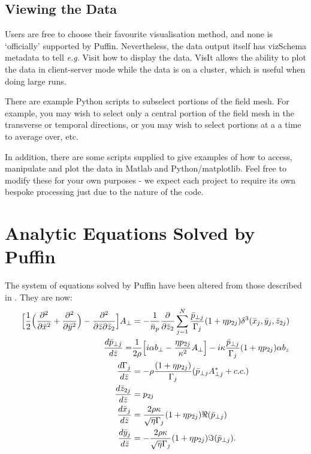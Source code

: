 \documentclass[12pt]{article}%
\begin{document}
\subsection{Viewing the Data}

Users are free to choose their favourite visualisation method, and none is `officially' supported by Puffin. Nevertheless, the data output itself has vizSchema metadata to tell \textit{e.g.} Visit how to display the data. VisIt allows the ability to plot the data in client-server mode while the data is on a cluster, which is useful when doing large runs. 

There are example Python scripts to subselect portions of the field mesh. For example, you may wish to select only a central portion of the field mesh in the transverse or temporal directions, or you may wish to select portions at a a time to average over, etc.

In addition, there are some scripts supplied to give examples of how to access, manipulate and plot the data in Matlab and Python/matplotlib. Feel free to modify these for your own purposes - we expect each project to require its own bespoke processing just due to the nature of the code.


\newpage

\section{Analytic Equations Solved by Puffin}

\label{puff-eqns}

The system of equations solved by Puffin have been altered from those described in \cite{puffin}. They are now:
\begin{align}
\Bigl[\frac{1}{2}\Bigl(\frac{\partial^2}{\partial\bar{x}^2} + \frac{\partial^2}{\partial\bar{y}^2}\Bigr) -  \frac{\partial^2}{\partial\bar{z}\partial\bar{z}_2}\Bigr]A_{\bot}  & = -\frac{1}{\bar{n}_p}\frac{\partial}{\partial \bar{z}_2}\sum_{j=1}^{N} \frac{\bar{p}_{\bot j}}{\Gamma_j} (1+\eta p_{2j})     \delta^3(\bar{x}_j,\bar{y}_j,\bar{z}_{2j})  \label{fieldeq2} \\
\frac{d \bar{p}_{\bot j}}{d \bar{z}} = & \frac{1}{2\rho}\Bigl[ i \alpha b_{\bot} - \frac{\eta p_{2j}}{\kappa^2}A_{\bot} \Bigr] - i\kappa \frac{ \bar{p}_{\bot j}}{\Gamma_j} (1 + \eta p_{2j})  \alpha b_z \label{pperpeqn2} \\
\frac{d \Gamma_{j}}{d \bar{z}} &= - \rho \frac{(1 + \eta p_{2j})}{\Gamma_j} (\bar{p}_{\bot j} A^*_{\bot j} + c.c.)  \label{gameqn} \\
\frac{d\bar{z}_{2j}}{d\bar{z}}& = p_{2j}  \label{z2eqgen2} \\
\frac{d\bar{x}_j}{d\bar{z}} &=  \frac{2 \rho \kappa}{\sqrt{\eta} \Gamma_j} (1 + \eta p_{2j}) \Re(\bar{p}_{\bot j}) \label{xeqgen2} \\
\frac{d\bar{y}_j}{d\bar{z}} &= - \frac{2 \rho \kappa}{\sqrt{\eta} \Gamma_j}  (1 + \eta p_{2j}) \Im(\bar{p}_{\bot j}). \label{yeqgen2}
\end{align}
\end{document}
